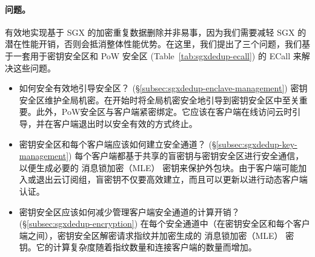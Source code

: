 \paragraph*{问题。} 有效地​​实现基于 SGX 的加密重复数据删除并非易事，因为我们需要减轻 SGX 的潜在性能开销，否则会抵消整体性能优势。在这里，我们提出了三个问题，我们基于一套用于密钥安全区和 PoW 安全区 (Table~\ref{tab:sgxdedup-ecall}) 的 ECall 来解决这些问题。

\begin{itemize}[leftmargin=*]
\item 如何安全有效地引导安全区？ (\S\ref{subsec:sgxdedup-enclave-management})
  密钥安全区维护全局机密。在开始时将全局机密安全地引导到密钥安全区中至关重要。此外，PoW安全区与客户端紧密绑定。它应该在客户端在线访问云时引导，并在客户端退出时以安全有效的方式终止。
\item 密钥安全区和每个客户端应该如何建立安全通道？ (\S\ref{subsec:sgxdedup-key-management})
  每个客户端都基于共享的盲密钥与密钥安全区进行安全通信，以便生成必要的 消息锁加密（MLE） 密钥来保护外包块。由于客户端可能加入或退出云订阅组，盲密钥不仅要高效建立，而且可以更新以进行动态客户端认证。
\item 密钥安全区应该如何减少管理客户端安全通道的计算开销？ (\S\ref{subsec:sgxdedup-encryption})
  在每个安全通道中（在密钥安全区和每个客户端之间），密钥安全区解密请求指纹并加密生成的 消息锁加密（MLE） 密钥。它的计算复杂度随着指纹数量和连接客户端的数量而增加。
\end{itemize}
